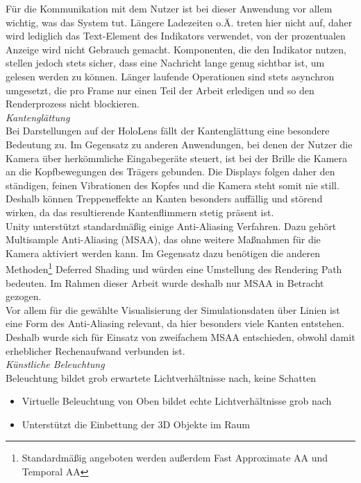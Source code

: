 Für die Kommunikation mit dem Nutzer ist bei dieser Anwendung vor allem wichtig, was das System tut. Längere Ladezeiten o.Ä. treten hier nicht auf, daher wird lediglich das Text-Element des Indikators verwendet, von der prozentualen Anzeige wird nicht Gebrauch gemacht. Komponenten, die den Indikator nutzen, stellen jedoch stets sicher, dass eine Nachricht lange genug sichtbar ist, um gelesen werden zu können. Länger laufende Operationen sind stets asynchron umgesetzt, die pro Frame nur einen Teil der Arbeit erledigen und so den Renderprozess nicht blockieren.\\

\textit{Kantenglättung}\\
Bei Darstellungen auf der HoloLens fällt der Kantenglättung eine besondere Bedeutung zu. Im Gegensatz zu anderen Anwendungen, bei denen der Nutzer die Kamera über herkömmliche Eingabegeräte steuert, ist bei der Brille die Kamera an die Kopfbewegungen des Trägers gebunden. Die Displays folgen daher den ständigen, feinen Vibrationen des Kopfes und die Kamera steht somit nie still. Deshalb können Treppeneffekte an Kanten besonders auffällig und störend wirken, da das resultierende Kantenflimmern stetig präsent ist.\\

Unity unterstützt standardmäßig einige Anti-Aliasing Verfahren. Dazu gehört Multisample Anti-Aliasing (MSAA), das ohne weitere Maßnahmen für die Kamera aktiviert werden kann. Im Gegensatz dazu benötigen die anderen Methoden\footnote{Standardmäßig angeboten werden außerdem Fast Approximate AA und Temporal AA} Deferred Shading und würden eine Umstellung des Rendering Path bedeuten. Im Rahmen dieser Arbeit wurde deshalb nur MSAA in Betracht gezogen.\\

Vor allem für die gewählte Visualisierung der Simulationsdaten über Linien ist eine Form des Anti-Aliasing relevant, da hier besonders viele Kanten entstehen. Deshalb wurde sich für Einsatz von zweifachem MSAA entschieden, obwohl damit erheblicher Rechenaufwand verbunden ist.\\

\textit{Künstliche Beleuchtung}\\
Beleuchtung bildet grob erwartete Lichtverhältnisse nach, keine Schatten\\
\begin{itemize}
\item Virtuelle Beleuchtung von Oben bildet echte Lichtverhältnisse grob nach
\item Unterstützt die Einbettung der 3D Objekte im Raum
\end{itemize}


